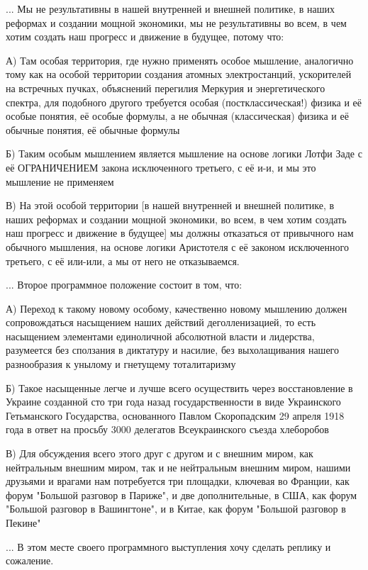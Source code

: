 ... Мы не результативны в нашей внутренней и внешней политике, в наших реформах
и создании мощной экономики, мы не результативны во всем, в чем хотим создать
наш прогресс и движение в будущее, потому что:

А) Там особая территория, где нужно применять особое мышление, аналогично тому
как на особой  территории создания атомных электростанций, ускорителей на
встречных пучках, объяснений перегилия Меркурия и энергетического спектра, для
подобного другого требуется особая (постклассическая!) физика и её особые
понятия, её особые формулы, а не обычная (классическая) физика и её обычные
понятия, её обычные формулы

Б) Таким особым мышлением является мышление на основе логики Лотфи Заде с её
ОГРАНИЧЕНИЕМ закона исключенного третьего, с её и-и, и мы это мышление не
применяем

В) На этой особой территории [в нашей внутренней и внешней политике, в наших
реформах и создании мощной экономики,  во всем, в чем хотим создать наш
прогресс и движение в будущее] мы должны отказаться от привычного нам обычного
мышления, на основе логики Аристотеля с её законом исключенного третьего, с её
или-или, а мы от него не отказываемся. 

... Второе программное положение состоит в том, что:

А) Переход к такому новому особому, качественно новому мышлению должен
сопровождаться насыщением наших действий деголленизацией, то есть насыщением
элементами единоличной абсолютной власти и лидерства, разумеется без сползания
в диктатуру и насилие, без выхолащивания нашего разнообразия к унылому и
гнетущему тоталитаризму

Б) Такое насыщенные легче и лучше всего осуществить через восстановление в
Украине созданной сто три года назад государственности в виде Украинского
Гетьманского Государства, основанного Павлом Скоропадским 29 апреля 1918 года в
ответ на просьбу 3000 делегатов Всеукраинского съезда хлеборобов

В) Для обсуждения всего этого друг с другом и с внешним миром, как нейтральным
внешним миром, так и не нейтральным внешним миром, нашими друзьями и врагами
нам потребуется три площадки, ключевая во Франции, как форум "Большой разговор
в Париже", и две дополнительные, в США, как форум "Большой разговор в
Вашингтоне", и в Китае, как форум "Большой разговор в Пекине"

... В этом месте своего программного выступления хочу сделать реплику и сожаление.

